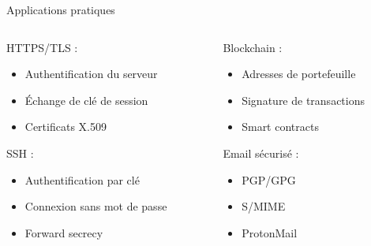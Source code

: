 \begin{frame}{Applications pratiques}
  \begin{columns}
    \begin{column}{0.5\textwidth}
      HTTPS/TLS :
      \begin{itemize}
        \item Authentification du serveur
        \item Échange de clé de session
        \item Certificats X.509
      \end{itemize}

      SSH :
      \begin{itemize}
        \item Authentification par clé
        \item Connexion sans mot de passe
        \item Forward secrecy
      \end{itemize}
    \end{column}

    \begin{column}{0.5\textwidth}
      Blockchain :
      \begin{itemize}
        \item Adresses de portefeuille
        \item Signature de transactions
        \item Smart contracts
      \end{itemize}

      Email sécurisé :
      \begin{itemize}
        \item PGP/GPG
        \item S/MIME
        \item ProtonMail
      \end{itemize}
    \end{column}
  \end{columns}
\end{frame}


